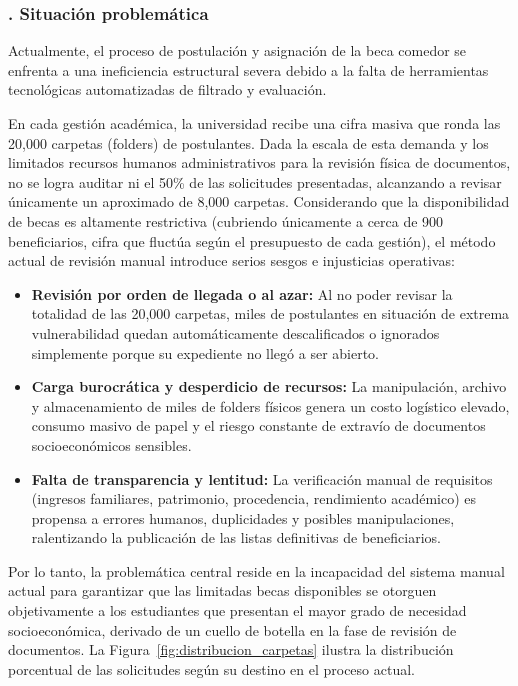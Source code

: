 \subsubsection{. Situación problemática}\label{sec:situacion_problematica}

Actualmente, el proceso de postulación y asignación de la beca comedor se enfrenta a una ineficiencia estructural severa debido a la falta de herramientas tecnológicas automatizadas de filtrado y evaluación.

En cada gestión académica, la universidad recibe una cifra masiva que ronda las 20,000 carpetas (folders) de postulantes. Dada la escala de esta demanda y los limitados recursos humanos administrativos para la revisión física de documentos, no se logra auditar ni el 50\% de las solicitudes presentadas, alcanzando a revisar únicamente un aproximado de 8,000 carpetas. Considerando que la disponibilidad de becas es altamente restrictiva (cubriendo únicamente a cerca de 900 beneficiarios, cifra que fluctúa según el presupuesto de cada gestión), el método actual de revisión manual introduce serios sesgos e injusticias operativas:

\begin{itemize}
    \item \textbf{Revisión por orden de llegada o al azar:} Al no poder revisar la totalidad de las 20,000 carpetas, miles de postulantes en situación de extrema vulnerabilidad quedan automáticamente descalificados o ignorados simplemente porque su expediente no llegó a ser abierto.

    \item \textbf{Carga burocrática y desperdicio de recursos:} La manipulación, archivo y almacenamiento de miles de folders físicos genera un costo logístico elevado, consumo masivo de papel y el riesgo constante de extravío de documentos socioeconómicos sensibles.

    \item \textbf{Falta de transparencia y lentitud:} La verificación manual de requisitos (ingresos familiares, patrimonio, procedencia, rendimiento académico) es propensa a errores humanos, duplicidades y posibles manipulaciones, ralentizando la publicación de las listas definitivas de beneficiarios.
\end{itemize}

Por lo tanto, la problemática central reside en la incapacidad del sistema manual actual para garantizar que las limitadas becas disponibles se otorguen objetivamente a los estudiantes que presentan el mayor grado de necesidad socioeconómica, derivado de un cuello de botella en la fase de revisión de documentos. La Figura~\ref{fig:distribucion_carpetas} ilustra la distribución porcentual de las solicitudes según su destino en el proceso actual.

